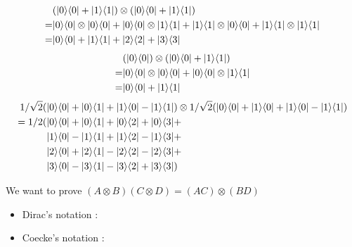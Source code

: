 \begin{align*}
  &(| 0 \rangle \langle 0 | + | 1 \rangle \langle 1 |) \otimes (| 0 \rangle \langle 0 | + | 1 \rangle \langle 1 |) \\
  =& | 0 \rangle \langle 0 | \otimes | 0 \rangle \langle 0 | + | 0 \rangle \langle 0 | \otimes | 1 \rangle \langle 1 | +
  | 1 \rangle \langle 1 | \otimes | 0 \rangle \langle 0 | + | 1 \rangle \langle 1 | \otimes | 1 \rangle \langle 1 | \\
  =& | 0 \rangle \langle 0 | + | 1 \rangle \langle 1 | + | 2 \rangle \langle 2 | +| 3 \rangle \langle 3 |
\end{align*}
\begin{align*}
  &(| 0 \rangle \langle 0 |) \otimes (| 0 \rangle \langle 0 | + | 1 \rangle \langle 1 |) \\
  =& | 0 \rangle \langle 0 | \otimes | 0 \rangle \langle 0 | + | 0 \rangle \langle 0 | \otimes | 1 \rangle \langle 1 |
  \\
  =& | 0 \rangle \langle 0 | + | 1 \rangle \langle 1 |
\end{align*}
\begin{align*}
  1/\sqrt 2  (&| 0 \rangle \langle 0 | + | 0 \rangle \langle 1 | + | 1 \rangle \langle 0 | - | 1 \rangle \langle 1 | )
    \otimes 1/\sqrt 2 (| 0 \rangle \langle 0 | + | 1 \rangle \langle 0 | + | 1 \rangle \langle 0 | - | 1 \rangle
    \langle 1 |) \\
  =1/2 (&| 0 \rangle \langle 0 | + | 0 \rangle \langle 1 | + | 0 \rangle \langle 2 | + | 0 \rangle \langle 3 | + \\
   &| 1 \rangle \langle 0 | - | 1 \rangle \langle 1 | + | 1 \rangle \langle 2 | - | 1 \rangle \langle 3 | + \\
   &| 2 \rangle \langle 0 | + | 2 \rangle \langle 1 | - | 2 \rangle \langle 2 | - | 2 \rangle \langle 3 | + \\
   &| 3 \rangle \langle 0 | - | 3 \rangle \langle 1 | - | 3 \rangle \langle 2 | + | 3 \rangle \langle 3 |)
\end{align*}

\newpage

We want to prove $(A \otimes B) (C \otimes D) = (AC) \otimes (BD)$

\begin{itemize}
  \item Dirac's notation :

  \item Coecke's notation :

\end{itemize}


